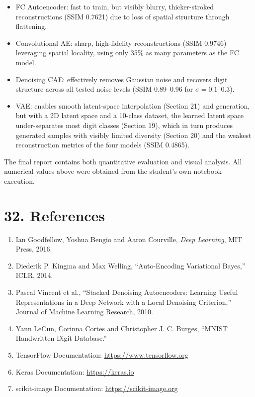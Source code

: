 \documentclass[10pt]{article}
\begin{document}
\begin{itemize}
\item FC Autoencoder: fast to train, but visibly blurry, thicker-stroked
reconstructions (SSIM 0.7621) due to loss of spatial structure through
flattening.
\item Convolutional AE: sharp, high-fidelity reconstructions (SSIM 0.9746)
leveraging spatial locality, using only 35\% as many parameters as the FC
model.
\item Denoising CAE: effectively removes Gaussian noise and recovers digit
structure across all tested noise levels (SSIM 0.89--0.96 for
$\sigma=0.1$--$0.3$).
\item VAE: enables smooth latent-space interpolation (Section 21) and
generation, but with a 2D latent space and a 10-class dataset, the
learned latent space under-separates most digit classes (Section 19),
which in turn produces generated samples with visibly limited diversity
(Section 20) and the weakest reconstruction metrics of the four models
(SSIM 0.4865).
\end{itemize}

The final report contains both quantitative evaluation and visual
analysis. All numerical values above were obtained from the student's own
notebook execution.

\section*{32. References}

\begin{enumerate}
\item Ian Goodfellow, Yoshua Bengio and Aaron Courville,
\emph{Deep Learning}, MIT Press, 2016.

\item Diederik P. Kingma and Max Welling,
``Auto-Encoding Variational Bayes,'' ICLR, 2014.

\item Pascal Vincent et al.,
``Stacked Denoising Autoencoders: Learning Useful Representations in a Deep
Network with a Local Denoising Criterion,'' Journal of Machine Learning
Research, 2010.

\item Yann LeCun, Corinna Cortes and Christopher J. C. Burges,
``MNIST Handwritten Digit Database.''

\item TensorFlow Documentation:
\url{https://www.tensorflow.org}

\item Keras Documentation:
\url{https://keras.io}

\item scikit-image Documentation:
\url{https://scikit-image.org}
\end{enumerate}
\end{document}
